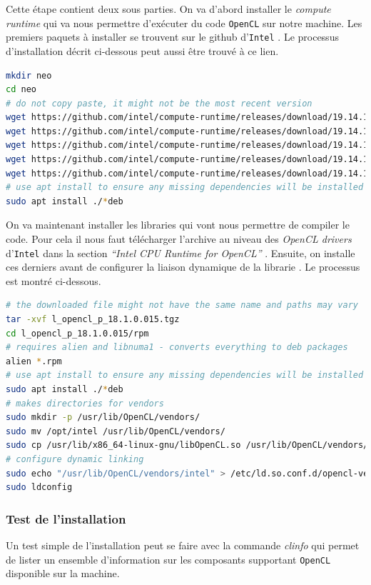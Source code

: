 Cette étape contient deux sous parties. On va d'abord installer le 
\textit{compute runtime} qui va nous permettre d'exécuter du code 
\texttt{OpenCL} sur notre machine. Les premiers paquets à installer se trouvent 
sur le github d'\texttt{Intel} \autocite{intelgit}. Le processus d'installation 
décrit ci-dessous peut aussi être trouvé à ce lien. 
\begin{lstlisting}[language=sh]
mkdir neo
cd neo
# do not copy paste, it might not be the most recent version
wget https://github.com/intel/compute-runtime/releases/download/19.14.12751/intel-gmmlib_19.1.1_amd64.deb
wget https://github.com/intel/compute-runtime/releases/download/19.14.12751/intel-igc-core_19.11.1622_amd64.deb
wget https://github.com/intel/compute-runtime/releases/download/19.14.12751/intel-igc-opencl_19.11.1622_amd64.deb
wget https://github.com/intel/compute-runtime/releases/download/19.14.12751/intel-opencl_19.14.12751_amd64.deb
wget https://github.com/intel/compute-runtime/releases/download/19.14.12751/intel-ocloc_19.14.12751_amd64.deb
# use apt install to ensure any missing dependencies will be installed
sudo apt install ./*deb         
\end{lstlisting}
\vspace{10pt}
On va maintenant installer les libraries qui vont nous permettre de compiler 
le code. Pour cela il nous faut télécharger l'archive au niveau des 
\textit{OpenCL drivers} d'\texttt{Intel} dans la section 
\textit{``Intel CPU Runtime for OpenCL''} \autocite{inteldrivers}. 
Ensuite, on installe ces derniers avant de configurer la liaison dynamique 
de la librarie \autocite{streamhpc}. Le processus est montré ci-dessous.
\begin{lstlisting}[language=sh]
# the downloaded file might not have the same name and paths may vary
tar -xvf l_opencl_p_18.1.0.015.tgz
cd l_opencl_p_18.1.0.015/rpm
# requires alien and libnuma1 - converts everything to deb packages
alien *.rpm
# use apt install to ensure any missing dependencies will be installed
sudo apt install ./*deb
# makes directories for vendors
sudo mkdir -p /usr/lib/OpenCL/vendors/
sudo mv /opt/intel /usr/lib/OpenCL/vendors/
sudo cp /usr/lib/x86_64-linux-gnu/libOpenCL.so /usr/lib/OpenCL/vendors/intel/libOpenCL.so
# configure dynamic linking
sudo echo "/usr/lib/OpenCL/vendors/intel" > /etc/ld.so.conf.d/opencl-vendor-intel.conf
sudo ldconfig
\end{lstlisting}

\subsubsection{Test de l'installation}

Un test simple de l'installation peut se faire avec la commande \textit{clinfo} 
qui permet de lister un ensemble d'information sur les composants supportant 
\texttt{OpenCL} disponible sur la machine.
